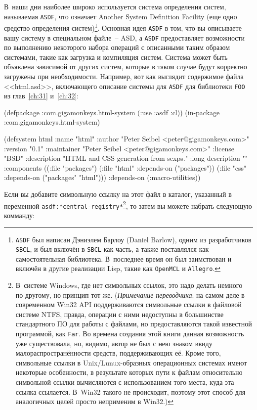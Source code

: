 В~наши дни наиболее широко используется система определения систем, называемая
\lstinline{ASDF}, что означает Another System Definition Facility (еще одно средство
определения систем)\footnote{\lstinline{ASDF} был написан Дэниэлем Барлоу (Daniel Barlow),
  одним из разработчиков \lstinline{SBCL}, и был включён в \lstinline{SBCL} как часть, а
  также поставлялся как самостоятельная библиотека. В~последнее время он был заимствован и
  включён в другие реализации Lisp, такие как \lstinline{OpenMCL} и
  \lstinline{Allegro}.}. Основная идея \lstinline{ASDF} в том, что вы описываете вашу
систему в специальном файле~-- ASD, а \lstinline{ASDF} предоставляет возможности по
выполнению некоторого набора операций с описанными таким образом системами, такие как
загрузка и компиляция систем. Система может быть объявлена зависимой от других систем,
которые в таком случае будут корректно загружены при необходимости. Например, вот как
выглядит содержимое файла <<html.asd>>, включающего описание системы для \lstinline{ASDF}
для библиотеки \lstinline{FOO} из глав~\ref{ch:31} и~\ref{ch:32}:

\begin{myverb}
(defpackage :com.gigamonkeys.html-system (:use :asdf :cl))
(in-package :com.gigamonkeys.html-system)

(defsystem html
  :name "html"
  :author "Peter Seibel <peter@gigamonkeys.com>"
  :version "0.1"
  :maintainer "Peter Seibel <peter@gigamonkeys.com>"
  :license "BSD"
  :description "HTML and CSS generation from sexps."
  :long-description ""
  :components
  ((:file "packages")
   (:file "html" :depends-on ("packages"))
   (:file "css" :depends-on ("packages" "html")))
  :depends-on (:macro-utilities))
\end{myverb}

Если вы добавите символьную ссылку на этот файл в каталог, указанный в переменной
\lstinline{asdf:*central-registry*}\footnote{В~системе Windows, где нет символьных ссылок, это
  надо делать немного по-другому, но принцип тот же. (\emph{Примечание переводчика}: на самом
  деле в современном Win32 API поддерживаются символьные ссылки в файловой системе NTFS,
  правда, операции с ними недоступны в большинстве стандартного ПО для работы с файлами, но
  предоставляются такой известной программой, как \lstinline{Far}. Во времена создания этой
  книги данная возможность уже существовала, но, видимо, автор не был с нею знаком ввиду
  малораспространённости средств, поддерживающих её. Кроме того, символьные ссылки в
  Unix/Lunux-образных операционных системах имеют некоторые особенности, в результате
  которых пути к файлам относительно символьной ссылки вычисляются с использованием того
  места, куда эта ссылка ссылается. В~Win32 такого не происходит, поэтому этот способ для
  аналогичных целей просто неприменим в Win32.) }, то затем вы можете набрать следующую
комманду:

